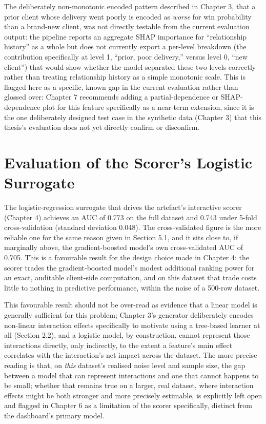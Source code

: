 \documentclass[12pt,oneside]{report}
\begin{document}
The deliberately non-monotonic encoded pattern described in Chapter 3,
that a prior client whose delivery went poorly is encoded as
\emph{worse} for win probability than a brand-new client, was not
directly testable from the current evaluation output: the pipeline
reports an aggregate SHAP importance for ``relationship history'' as a
whole but does not currently export a per-level breakdown (the
contribution specifically at level 1, ``prior, poor delivery,'' versus
level 0, ``new client'') that would show whether the model separated
these two levels correctly rather than treating relationship history as
a simple monotonic scale. This is flagged here as a specific, known gap
in the current evaluation rather than glossed over: Chapter 7 recommends
adding a partial-dependence or SHAP-dependence plot for this feature
specifically as a near-term extension, since it is the one deliberately
designed test case in the synthetic data (Chapter 3) that this thesis's
evaluation does not yet directly confirm or disconfirm.

\hypertarget{evaluation-of-the-scorers-logistic-surrogate}{%
\section{Evaluation of the Scorer's Logistic
Surrogate}\label{evaluation-of-the-scorers-logistic-surrogate}}

The logistic-regression surrogate that drives the artefact's interactive
scorer (Chapter 4) achieves an AUC of 0.773 on the full dataset and
0.743 under 5-fold cross-validation (standard deviation 0.048). The
cross-validated figure is the more reliable one for the same reason
given in Section 5.1, and it sits close to, if marginally above, the
gradient-boosted model's own cross-validated AUC of 0.705. This is a
favourable result for the design choice made in Chapter 4: the scorer
trades the gradient-boosted model's modest additional ranking power for
an exact, auditable client-side computation, and on this dataset that
trade costs little to nothing in predictive performance, within the
noise of a 500-row dataset.

This favourable result should not be over-read as evidence that a linear
model is generally sufficient for this problem; Chapter 3's generator
deliberately encodes non-linear interaction effects specifically to
motivate using a tree-based learner at all (Section 2.2), and a logistic
model, by construction, cannot represent those interactions directly,
only indirectly, to the extent a feature's main effect correlates with
the interaction's net impact across the dataset. The more precise
reading is that, on \emph{this} dataset's realised noise level and
sample size, the gap between a model that can represent interactions and
one that cannot happens to be small; whether that remains true on a
larger, real dataset, where interaction effects might be both stronger
and more precisely estimable, is explicitly left open and flagged in
Chapter 6 as a limitation of the scorer specifically, distinct from the
dashboard's primary model.
\end{document}
